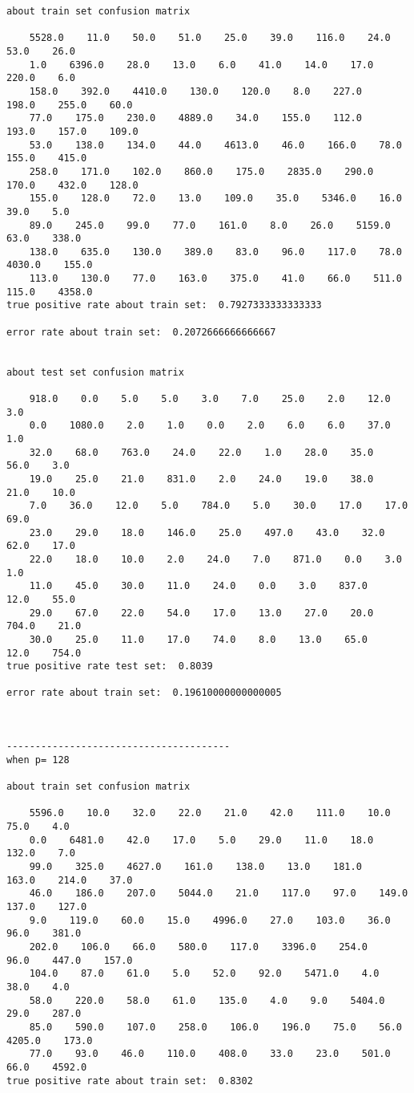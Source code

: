 \documentclass[11pt]{article}
\begin{document}
\begin{Verbatim}[commandchars=\\\{\}]
about train set confusion matrix

    5528.0    11.0    50.0    51.0    25.0    39.0    116.0    24.0    53.0    26.0
    1.0    6396.0    28.0    13.0    6.0    41.0    14.0    17.0    220.0    6.0
    158.0    392.0    4410.0    130.0    120.0    8.0    227.0    198.0    255.0    60.0
    77.0    175.0    230.0    4889.0    34.0    155.0    112.0    193.0    157.0    109.0
    53.0    138.0    134.0    44.0    4613.0    46.0    166.0    78.0    155.0    415.0
    258.0    171.0    102.0    860.0    175.0    2835.0    290.0    170.0    432.0    128.0
    155.0    128.0    72.0    13.0    109.0    35.0    5346.0    16.0    39.0    5.0
    89.0    245.0    99.0    77.0    161.0    8.0    26.0    5159.0    63.0    338.0
    138.0    635.0    130.0    389.0    83.0    96.0    117.0    78.0    4030.0    155.0
    113.0    130.0    77.0    163.0    375.0    41.0    66.0    511.0    115.0    4358.0
true positive rate about train set:  0.7927333333333333

error rate about train set:  0.2072666666666667


about test set confusion matrix

    918.0    0.0    5.0    5.0    3.0    7.0    25.0    2.0    12.0    3.0
    0.0    1080.0    2.0    1.0    0.0    2.0    6.0    6.0    37.0    1.0
    32.0    68.0    763.0    24.0    22.0    1.0    28.0    35.0    56.0    3.0
    19.0    25.0    21.0    831.0    2.0    24.0    19.0    38.0    21.0    10.0
    7.0    36.0    12.0    5.0    784.0    5.0    30.0    17.0    17.0    69.0
    23.0    29.0    18.0    146.0    25.0    497.0    43.0    32.0    62.0    17.0
    22.0    18.0    10.0    2.0    24.0    7.0    871.0    0.0    3.0    1.0
    11.0    45.0    30.0    11.0    24.0    0.0    3.0    837.0    12.0    55.0
    29.0    67.0    22.0    54.0    17.0    13.0    27.0    20.0    704.0    21.0
    30.0    25.0    11.0    17.0    74.0    8.0    13.0    65.0    12.0    754.0
true positive rate test set:  0.8039

error rate about train set:  0.19610000000000005



---------------------------------------
when p= 128

about train set confusion matrix

    5596.0    10.0    32.0    22.0    21.0    42.0    111.0    10.0    75.0    4.0
    0.0    6481.0    42.0    17.0    5.0    29.0    11.0    18.0    132.0    7.0
    99.0    325.0    4627.0    161.0    138.0    13.0    181.0    163.0    214.0    37.0
    46.0    186.0    207.0    5044.0    21.0    117.0    97.0    149.0    137.0    127.0
    9.0    119.0    60.0    15.0    4996.0    27.0    103.0    36.0    96.0    381.0
    202.0    106.0    66.0    580.0    117.0    3396.0    254.0    96.0    447.0    157.0
    104.0    87.0    61.0    5.0    52.0    92.0    5471.0    4.0    38.0    4.0
    58.0    220.0    58.0    61.0    135.0    4.0    9.0    5404.0    29.0    287.0
    85.0    590.0    107.0    258.0    106.0    196.0    75.0    56.0    4205.0    173.0
    77.0    93.0    46.0    110.0    408.0    33.0    23.0    501.0    66.0    4592.0
true positive rate about train set:  0.8302


\end{Verbatim}
\end{document}
